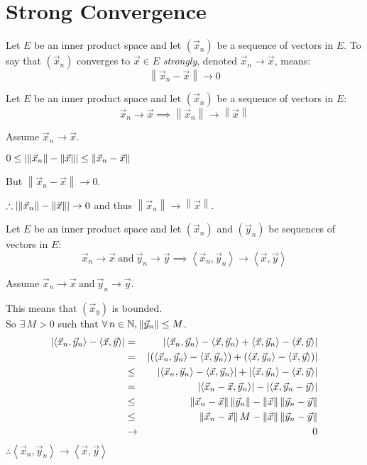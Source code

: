 \documentclass[letterpaper,12pt,fleqn]{article}
\newcommand{\vx}{\vec{x}}
\newcommand{\vy}{\vec{y}}
\newcommand{\norm}[1]{\left\|#1\right\|}
\newcommand{\inner}[1]{\left<#1\right>}
\begin{document}
\section*{Strong Convergence}

\begin{definition}
  Let $E$ be an inner product space and let $(\vx_n)$ be a sequence of vectors
  in $E$. To say that $(\vx_n)$ converges to $\vx\in E$ \emph{strongly}, denoted
  $\vx_n\to\vx$, means:
  \[\norm{\vx_n-\vx}\to0\]
\end{definition}

\begin{theorem}
  Let $E$ be an inner product space and let $(\vx_n)$ be a sequence of vectors
  in $E$:
  \[\vx_n\to\vx\implies\norm{\vx_n}\to\norm{\vx}\]
\end{theorem}

\begin{theproof}
  Assume $\vx_n\to\vx$.
  
  $0\le\abs{\norm{\vx_n}-\norm{\vx}}\le\norm{\vx_n-\vx}$

  But $\norm{\vx_n-\vx}\to0$.

  $\therefore\abs{\norm{\vx_n}-\norm{\vx}}\to0$ and thus
  $\norm{\vx_n}\to\norm{\vx}$.
\end{theproof}

\begin{theorem}
  Let $E$ be an inner product space and let $(\vx_n)$ and $(\vy_n)$ be
  sequences of vectors in $E$:
  \[\vx_n\to\vx\ \mbox{and}\ \vy_n\to\vy\implies
  \inner{\vx_n,\vy_n}\to\inner{\vx,\vy}\]
\end{theorem}

\begin{theproof}
  Assume $\vx_n\to\vx\ \mbox{and}\ \vy_n\to\vy$.

  This means that $(\vx_y)$ is bounded. \\
  So $\exists\,M>0$ such that $\forall\,n\in\N,\norm{\vy_n}\le M$.
  \begin{eqnarray*}
    \abs{\inner{\vx_n,\vy_n}-\inner{\vx,\vy}} &=&
    \abs{\inner{\vx_n,\vy_n}-\inner{\vx,\vy_n}+\inner{\vx,\vy_n}-
      \inner{\vx,\vy}} \\
    &=& \abs{(\inner{\vx_n,\vy_n}-\inner{\vx,\vy_n})+(\inner{\vx,\vy_n}-
      \inner{\vx,\vy})} \\
    &\le& \abs{\inner{\vx_n,\vy_n}-\inner{\vx,\vy_n}}+
    \abs{\inner{\vx,\vy_n}-\inner{\vx,\vy}} \\
    &=& \abs{\inner{\vx_n-\vx,\vy_n}}-\abs{\inner{\vx,\vy_n-\vy}} \\
    &\le& \norm{\vx_n-\vx}\norm{\vy_n}-\norm{\vx}\norm{\vy_n-\vy} \\
    &\le& \norm{\vx_n-\vx}M-\norm{\vx}\norm{\vy_n-\vy} \\
    &\to& 0
  \end{eqnarray*}
  $\therefore\inner{\vx_n,\vy_n}\to\inner{\vx,\vy}$
\end{theproof}
\end{document}
